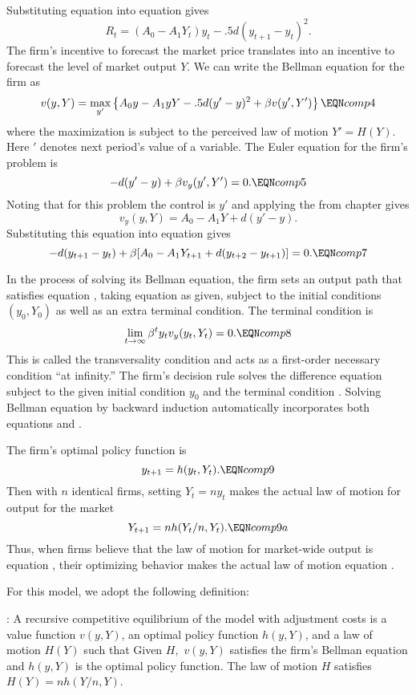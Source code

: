 Substituting equation  into equation  gives
$$ R_t = (A_0 - A_1 Y_t) y_t - .5 d (y_{t+1} - y_t )^2. $$
The firm's incentive to forecast the market price
translates into an incentive to forecast
the level of market output $Y$.
We can write the Bellman equation for the firm
as
$$ v(y,Y) = \max_{y'} \left\{ A_0 y - A_1 y Y - .5 d (y' - y)^2
      + \beta v(y', Y')\right\}  \EQN comp4$$
where the maximization is subject to the perceived law of motion $Y'=H(Y)$.
Here $'$ denotes next period's value of a variable.
The Euler equation for the firm's problem is
$$ - d(y' - y) + \beta v_y(y',Y') =0. \EQN comp5$$
Noting that for this problem the control is $y'$ and applying
the  from chapter  %
 gives
$$ v_y(y,Y) = A_0 - A_1 Y + d(y' - y). $$
Substituting this equation into equation  gives
$$ -d(y_{t+1} - y_t) + \beta [A_0 - A_1 Y_{t+1} + d(y_{t+2} - y_{t+1} )] =0.
\EQN comp7  $$

In the process of
solving its Bellman equation,
the firm sets  an output   path  that satisfies equation
, taking equation
  as given,  subject to the initial conditions
$(y_0, Y_0)$ as well as an extra
terminal condition.  The  terminal condition is
$$ \lim_{t \rightarrow \infty } \beta^t y_t v_y(y_{t}, Y_t) = 0. \EQN comp8  $$
This is called the %
transversality condition and acts as
 a first-order necessary  condition  ``at infinity.''
The firm's decision rule solves the difference
equation  subject to the given initial condition
$y_0$ and the terminal condition .
Solving  Bellman equation  by backward induction automatically
incorporates both equations  and .

  The  firm's optimal policy function is
$$ y_{t+1} = h(y_t, Y_t). \EQN comp9 $$
Then with $n$ identical firms, setting $Y_t = ny_t$ makes
 the actual law of motion for
output for the market
$$ Y_{t+1} = n h(Y_t/n, Y_t). \EQN comp9a $$
Thus, when firms believe that the law of motion for market-wide
 output is equation , their optimizing behavior makes
the actual law of motion equation .

  For this model, we adopt the following
definition:

:  A recursive competitive equilibrium of
the model with adjustment costs is a value function
$v(y, Y)$, an optimal policy function
$h(y, Y)$, and   a law of motion $H(Y)$ such that
\medskip
{} Given $H,$ $v(y,Y)$ satisfies the firm's Bellman
equation and $h(y,Y)$ is the optimal policy function.
\medskip
{}  The law of motion $H$ satisfies $H(Y)= nh(Y/n,Y)$.

